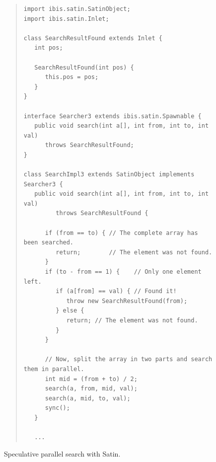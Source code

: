 \documentclass[10pt]{article}
\begin{document}
\begin{figure}[t!]
\small{
\begin{quote}
\begin{verbatim}
import ibis.satin.SatinObject;
import ibis.satin.Inlet;

class SearchResultFound extends Inlet {
   int pos;

   SearchResultFound(int pos) {
      this.pos = pos;
   }
}

interface Searcher3 extends ibis.satin.Spawnable {
   public void search(int a[], int from, int to, int val)
      throws SearchResultFound;
}

class SearchImpl3 extends SatinObject implements Searcher3 {
   public void search(int a[], int from, int to, int val)
         throws SearchResultFound {

      if (from == to) { // The complete array has been searched.
         return;        // The element was not found.
      }
      if (to - from == 1) {    // Only one element left.
         if (a[from] == val) { // Found it!
            throw new SearchResultFound(from);
         } else {
            return; // The element was not found.
         }
      }

      // Now, split the array in two parts and search them in parallel.
      int mid = (from + to) / 2;
      search(a, from, mid, val);
      search(a, mid, to, val);
      sync();
   }

   ...
\end{verbatim}
\end{quote}
}
\caption{Speculative parallel search with Satin.}
\label{satin-spec-search-fig1}
\end{figure}
\end{document}
